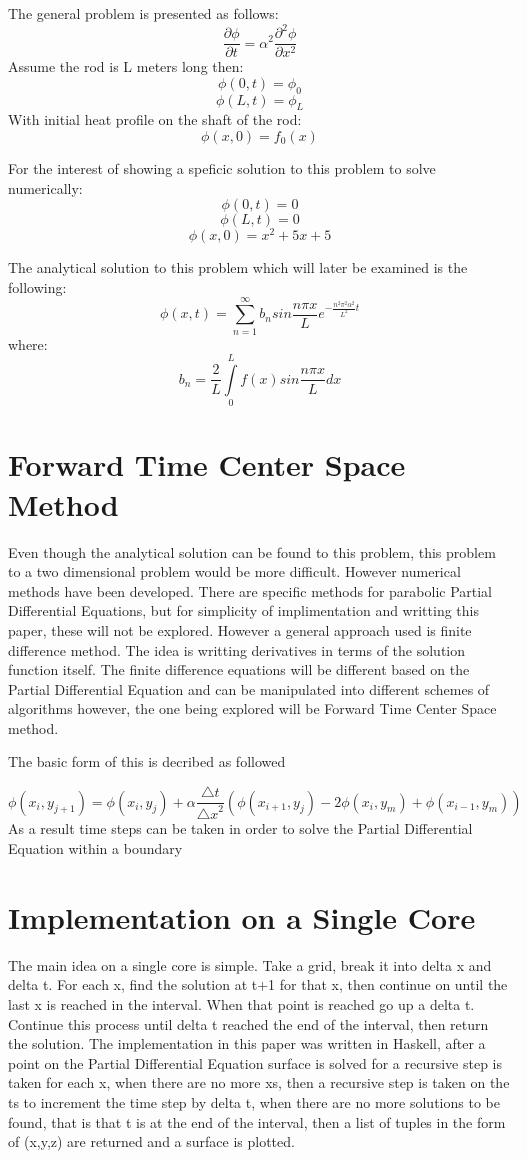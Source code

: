 \documentclass{sig-alternate}
\begin{document}
The general problem is presented as follows:
\[ \frac{\partial \phi}{\partial t}= \alpha^2 \frac{\partial^2 \phi}{\partial x^2} \]
Assume the rod is L meters long then:
\[  \phi(0,t)=\phi_0  \] 
\[  \phi(L,t)=\phi_L  \]   
With initial heat profile on the shaft of the rod:
\[  \phi(x,0)=f_0(x)  \] 

For the interest of showing a speficic solution to this problem to solve numerically:
\[  \phi(0,t)=0  \] 
\[  \phi(L,t)=0 \]  
\[  \phi(x,0)=x^2 +5x + 5  \]

The analytical solution to this problem which will later be examined is the following:
\[  \phi(x,t)=\sum_{n=1}^{\infty} b_n sin\frac{n{\pi}x}{L}e^{{-\frac {n^2\pi^2\alpha^2} {L^2}}t} \]
where:
\[  b_n={\frac {2} {L}}\int \limits_0^L {f(x)sin \frac{n{\pi}x}{L} dx} \] 


\section{Forward Time Center Space Method}
\label{FTCSP}
Even though the analytical solution can be found to this problem, this problem to a two dimensional problem would be more difficult. However numerical methods have been developed. There are specific methods for parabolic Partial Differential Equations, but for simplicity of implimentation and writting this paper, these will not be explored. However a general approach used is finite difference method. The idea is writting derivatives in terms of the solution function itself. The finite difference equations will be different based on the Partial Differential Equation and can be manipulated into different schemes of algorithms however, the one being explored will be Forward Time Center Space method. 

The basic form of this is decribed as followed

\[  \phi(x_i,y_{j+1})= \phi(x_i,y_j) + \alpha \frac {\bigtriangleup t} {{\bigtriangleup x}^2}(\phi(x_{i+1},y_j) -2\phi(x_i,y_m) + \phi(x_{i-1},y_m)) \] 
As a result time steps can be taken in order to solve the Partial Differential Equation within a boundary
\section{Implementation on a Single Core}
\label{Implementation}
The main idea on a single core is simple. Take a grid, break it into delta x and delta t. For each x, find the solution at t+1 for that x, then continue on until the last x is reached in the interval. When that point is reached go up a delta t. Continue this process until delta t reached the end of the interval, then return the solution. The implementation in this paper was written in Haskell, after a point on the Partial Differential Equation surface is solved for a recursive step is taken for each x, when there are no more xs, then a recursive step is taken on the ts to increment the time step by delta t, when there are no more solutions to be found, that is that t is at the end of the interval, then a list of tuples in the form of (x,y,z) are returned and a surface is plotted. 
\end{document}
